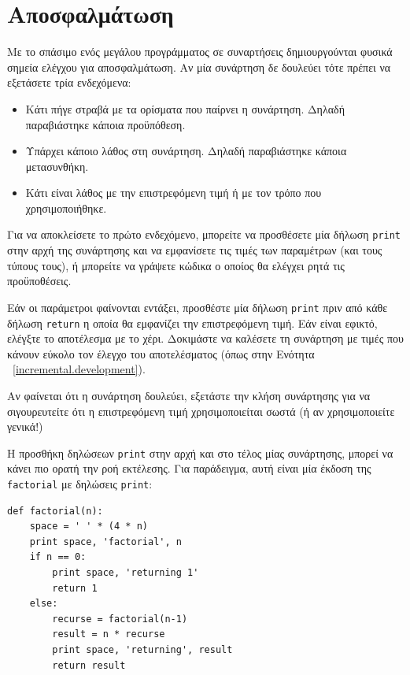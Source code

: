 \documentclass[10pt]{book}
\begin{document}
\section{Αποσφαλμάτωση}
\label{factdebug}

Με το σπάσιμο ενός μεγάλου προγράμματος σε συναρτήσεις δημιουργούνται
φυσικά σημεία ελέγχου για αποσφαλμάτωση. 
Αν μία συνάρτηση δε δουλεύει τότε πρέπει να εξετάσετε τρία ενδεχόμενα:

\begin{itemize}

\item  Κάτι πήγε στραβά με τα ορίσματα που παίρνει η συνάρτηση.
Δηλαδή παραβιάστηκε κάποια προϋπόθεση.

\item  Υπάρχει κάποιο λάθος στη συνάρτηση. Δηλαδή παραβιάστηκε κάποια 
μετασυνθήκη.

\item  Κάτι είναι λάθος με την επιστρεφόμενη τιμή ή με τον τρόπο
που χρησιμοποιήθηκε.

\end{itemize}

Για να αποκλείσετε το πρώτο ενδεχόμενο, μπορείτε να προσθέσετε μία δήλωση
{\tt print} στην αρχή της συνάρτησης και να εμφανίσετε τις τιμές των
παραμέτρων (και τους τύπους τους), ή μπορείτε να γράψετε κώδικα ο οποίος θα
ελέγχει ρητά τις προϋποθέσεις.

Εάν οι παράμετροι φαίνονται εντάξει, προσθέστε μία δήλωση {\tt print}
πριν από κάθε δήλωση {\tt return} η οποία θα εμφανίζει την
επιστρεφόμενη τιμή. Εάν είναι εφικτό, ελέγξτε το αποτέλεσμα με το χέρι.
Δοκιμάστε να καλέσετε τη συνάρτηση με τιμές που κάνουν εύκολο τον έλεγχο
του αποτελέσματος (όπως στην Ενότητα ~\ref{incremental.development}).

Αν φαίνεται ότι η συνάρτηση δουλεύει, εξετάστε την κλήση συνάρτησης
για να σιγουρευτείτε ότι η επιστρεφόμενη τιμή χρησιμοποιείται σωστά
(ή αν χρησιμοποιείτε γενικά!)

Η προσθήκη δηλώσεων {\tt print} στην αρχή και στο τέλος μίας
συνάρτησης, μπορεί να κάνει πιο ορατή την ροή εκτέλεσης.
Για παράδειγμα, αυτή είναι μία έκδοση της {\tt factorial} με
δηλώσεις {\tt print}:

\begin{verbatim}
def factorial(n):
    space = ' ' * (4 * n)
    print space, 'factorial', n
    if n == 0:
        print space, 'returning 1'
        return 1
    else:
        recurse = factorial(n-1)
        result = n * recurse
        print space, 'returning', result
        return result
\end{verbatim}
%
\end{document}
